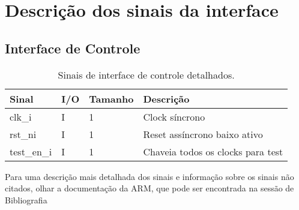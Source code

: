 \newpage

\section{Descrição dos sinais da interface} %
\label{sec:descrição_detalhada_de_sinais}

\subsection{Interface de Controle}
\label{sec:if_controle}

\begin{table}[H]
  \centering
  \renewcommand\arraystretch{1.25}
  \caption{Sinais de interface de controle detalhados.}
  \vspace{2mm}
  \begin{tabular}{|P{4.0cm}|P{0.7cm}|P{1.5cm}|P{8cm}|}
    \hline
    \textbf{Sinal}        & \textbf{I/O} & \textbf{Tamanho} & \textbf{Descrição}                                    \\ \hline
    clk\_i                 & I            & 1                & Clock síncrono                                       \\ \hline
    rst\_ni                & I            & 1                & Reset assíncrono baixo ativo                         \\ \hline
    test\_en\_i            & I            & 1                & Chaveia todos os clocks para test                    \\ \hline
 \end{tabular} 
\end{table}
Para uma descrição mais detalhada dos sinais e informação sobre os sinais não citados, olhar a documentação da ARM, que pode ser encontrada na sessão de Bibliografia
